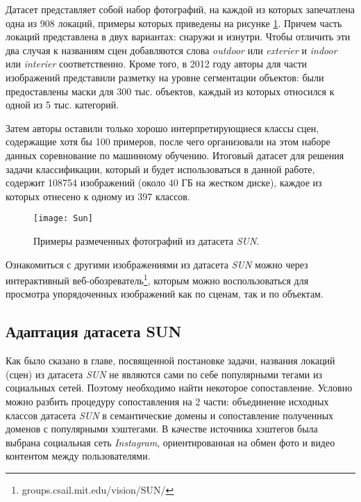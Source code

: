 \indent
\indent
Датасет представляет собой набор фотографий, на каждой из которых запечатлена
одна из 908 локаций, примеры которых приведены на рисунке \ref{tikzpicture: sun}. Причем
часть локаций представлена в двух
вариантах: снаружи и изнутри. Чтобы отличить эти 
два случая к названиям сцен добавляются слова \textit{outdoor} или \textit{exterier} и \textit{indoor} или \textit{interier} соответственно.
Кроме того, в 2012 году авторы для части изображений представили разметку 
на уровне сегментации объектов: были предоставлены маски для 300 тыс. объектов, каждый из которых относился к одной из 5 тыс. категорий.

\indent
\indent
Затем авторы оставили только хорошо интерпретирующиеся классы сцен, 
содержащие хотя бы 100 примеров, после чего организовали на этом
наборе данных соревнование по машинному обучению. Итоговый датасет
для решения задачи классификации,
который и будет использоваться в данной работе,
содержит 108754 изображений (около 40 ГБ на жестком диске), каждое 
из которых отнесено к одному из 397 классов.

\begin{figure}[h]
    \begin{center}
   	    \texttt{[image: Sun]}
   	\end{center}
   	\caption{Примеры размеченных фотографий из датасета \textit{SUN}.}
   	\label{tikzpicture: sun}
\end{figure}

Ознакомиться с другими изображениями из датасета \textit{SUN} можно через 
интерактивный веб-обозреватель\footnote{groups.csail.mit.edu/vision/SUN/}, которым
можно воспользоваться для просмотра упорядоченных изображений как 
по сценам, так и по объектам.


\subsection{Адаптация датасета SUN}

\indent
\indent
Как было сказано в главе, посвященной постановке задачи,
 названия локаций (сцен) из датасета \textit{SUN} не 
являются сами по себе популярными тегами из социальных сетей. Поэтому 
необходимо найти некоторое сопоставление. Условно можно
разбить процедуру сопоставления на 2 части: объединение исходных классов 
датасета \textit{SUN} в семантические домены и сопоставление полученных доменов
с популярными хэштегами. В качестве источника хэштегов была выбрана социальная
сеть \textit{Instagram}, ориентированная на обмен фото
и видео контентом между пользователями.

